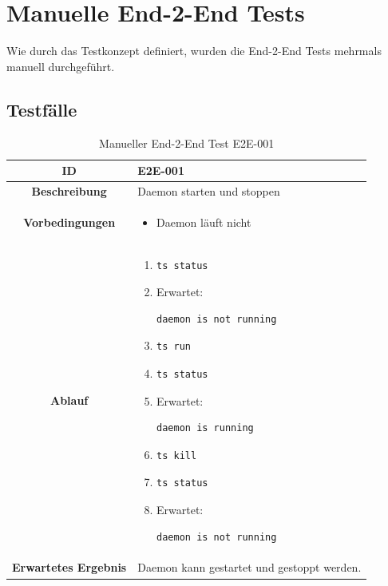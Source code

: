 \documentclass[a4paper,12pt]{report}
\begin{document}
    \section{Manuelle End-2-End Tests}
    Wie durch das Testkonzept definiert, wurden die End-2-End Tests mehrmals manuell durchgeführt.

    \subsection{Testfälle}

    \begin{table}[h!]
        \centering
        \setlength{\leftmargini}{0.8cm}
        \begin{tabular}{|c|p{10cm}|}
            \hline
            \textbf{ID}           & E2E-001 \\ \hline
            \textbf{Beschreibung} & Daemon starten und stoppen \\ \hline
            \textbf{Vorbedingungen} &
            \begin{itemize}
                \item Daemon läuft nicht
            \end{itemize} \\ \hline
            \textbf{Ablauf} &
            \begin{enumerate}
                \item \begin{verbatim}ts status\end{verbatim}
                \item Erwartet: \begin{verbatim}daemon is not running\end{verbatim}
                \item \begin{verbatim}ts run\end{verbatim}
                \item \begin{verbatim}ts status\end{verbatim}
                \item Erwartet: \begin{verbatim}daemon is running\end{verbatim}
                \item \begin{verbatim}ts kill\end{verbatim}
                \item \begin{verbatim}ts status\end{verbatim}
                \item Erwartet: \begin{verbatim}daemon is not running\end{verbatim}
            \end{enumerate} \\ \hline
            \textbf{Erwartetes Ergebnis} & Daemon kann gestartet und gestoppt werden. \\ \hline
        \end{tabular}
        \caption{Manueller End-2-End Test E2E-001}\label{tab:e2e-1}
    \end{table}
\end{document}
